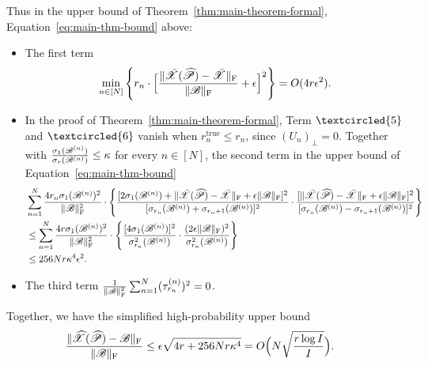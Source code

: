 \documentclass{article}
\newcommand{\T}[2][]{#1\mathscr{\MakeUppercase{#2}}}
\newcommand{\norm}[1]{\Vert #1 \Vert}
\newcommand{\fnorm}[1]{\norm{#1}_{\mathrm{F}}}
\def\Ph{\widehat P}
\theoremstyle{plain}
\begin{document}
Thus in the upper bound of Theorem~\ref{thm:main-theorem-formal}, Equation~\ref{eq:main-thm-bound} above:
\begin{itemize}
	\item The first term
	\begin{equation}
		\begin{aligned}
			\min_{n \in [N]} \Bigg\{r_n \cdot \Big[\frac{\fnorm{\bar{\T{X}}(\T{\Ph}) - \bar{\T{X}}}}{\fnorm{\T{B}}} + \epsilon \Big]^2 \Bigg\} = O(4 r \epsilon^2).
		\end{aligned}
		\nonumber
	\end{equation}
	\item In the proof of Theorem~\ref{thm:main-theorem-formal}, Term $\textcircled{5}$ and $\textcircled{6}$ vanish when $r_n^\mathrm{true} \leq r_n$, since $(U_n)_\perp = 0$. 
	Together with $\frac{\sigma_{1} (\T{B}^{(n)})}{\sigma_r (\T{B}^{(n)})} \leq \kappa$ for every $n \in [N]$, the second term in the upper bound of Equation~\ref{eq:main-thm-bound}
	\begin{equation}
		\begin{aligned}
			& \sum_{n=1}^N \frac{4 r_n \sigma_1 (\T{B}^{(n)})^2}{\fnorm{\T{B}}^2}  \cdot \Bigg\{\frac{[2 \sigma_1 (\T{B}^{(n)}) + \fnorm{\bar{\T{X}}(\T{\Ph}) - \bar{\T{X}}} + \epsilon \fnorm{\T{B}}]^2}{[\sigma_{r_n} (\T{B}^{(n)}) + \sigma_{r_n+1} (\T{B}^{(n)})]^2} \cdot \frac{[\fnorm{\bar{\T{X}}(\T{\Ph}) - \bar{\T{X}}} + \epsilon \fnorm{\T{B}}]^2}{[\sigma_{r_n} (\T{B}^{(n)}) - \sigma_{r_n+1} (\T{B}^{(n)})]^2} \Bigg\} \\
			& \leq \sum_{n=1}^N \frac{4 r \sigma_1 (\T{B}^{(n)})^2}{\fnorm{\T{B}}^2} \cdot \Bigg\{\frac{[4 \sigma_1 (\T{B}^{(n)})]^2}{\sigma_{r_n}^2 (\T{B}^{(n)})} \cdot \frac{(2 \epsilon \fnorm{\T{B}})^2}{\sigma_{r_n}^2 (\T{B}^{(n)})} \Bigg\} \\
			& \leq 256 N r \kappa^4 \epsilon^2.
		\end{aligned}
		\nonumber
	\end{equation}
	\item The third term $ \frac{1}{\fnorm{\T{B}}^2} \sum_{n=1}^{N} (\tau_{r_n}^{(n)})^2 = 0$.
\end{itemize}

Together, we have the simplified high-probability upper bound
\begin{equation}
	\begin{aligned}
		& \frac{\fnorm{\widehat{\T{X}}(\widehat{\T{P}}) - \T{B}}}{\fnorm{\T{B}}} \leq \epsilon \sqrt{4 r + 256 N r \kappa^4 } = O\Big( N \sqrt{\frac{r \log I}{I}} \Big).
	\end{aligned}
	\label{eq:cor-of-main-thm-bound}
	\nonumber
\end{equation}
\end{document}
